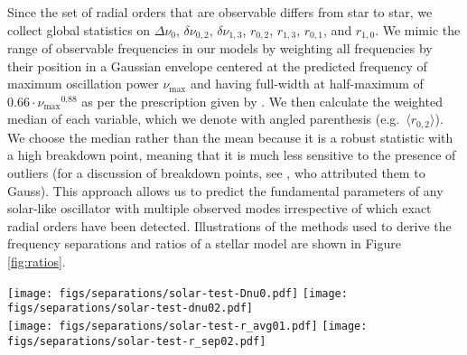 \documentclass[iop,apj,twocolappendix]{emulateapj}
\begin{document}
Since the set of radial orders that are observable differs from star to star, we collect global statistics on $\Delta\nu_0$, $\delta\nu_{0,2}$, $\delta\nu_{1,3}$, $r_{0,2}$, $r_{1,3}$, $r_{0,1}$, and $r_{1,0}$. We mimic the range of observable frequencies in our models by weighting all frequencies by their position in a Gaussian envelope centered at the predicted frequency of maximum oscillation power $\nu_{\max}$ and having full-width at half-maximum of $0.66\cdot\nu_{\max}{}^{0.88}$ as per the prescription given by \citet{2012A&A...537A..30M}. We then calculate the weighted median of each variable, which we denote with angled parenthesis (e.g.\ $\langle r_{0,2}\rangle$). We choose the median rather than the mean because it is a robust statistic with a high breakdown point, meaning that it is much less sensitive to the presence of outliers (for a discussion of breakdown points, see \citealt{hampel1971general}, who attributed them to Gauss). This approach allows us to predict the fundamental parameters of any solar-like oscillator with multiple observed modes irrespective of which exact radial orders have been detected. Illustrations of the methods used to derive the frequency separations and ratios of a stellar model are shown in Figure \ref{fig:ratios}. 

\begin{figure*}
    \centering
    \texttt{[image: figs/separations/solar-test-Dnu0.pdf]}\hfill
    \texttt{[image: figs/separations/solar-test-dnu02.pdf]}\\
    \texttt{[image: figs/separations/solar-test-r\_avg01.pdf]}\hfill
    \texttt{[image: figs/separations/solar-test-r\_sep02.pdf]}%
    \caption{The large and small frequency separations $\Delta\nu_0$ and $\delta\nu_{0,2}$ (top) and frequency ratios $r_{0,1}$ and $r_{0,2}$ (bottom) of a stellar model shown as a function of frequency. The vertical dotted line indicates $\nu_{\max}$. A $\nu_{\max}$-weighted linear fit is indicated with a dashed diagonal line to guide the eye. Point sizes and colors are proportional to the applied weighting, with blue points having a large influence and red points having little. }%
    \label{fig:ratios}
\end{figure*}
\end{document}
